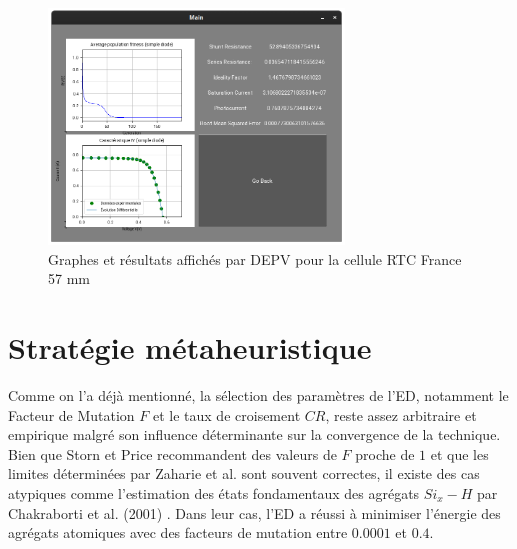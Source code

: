 \begin{figure}[H]
  \begin{center}
    \includegraphics[width=0.7\textwidth]{resources/reswindow.png}
    \caption{Graphes et résultats affichés par DEPV pour la cellule RTC France 57 mm}
    \label{fig:depvres}
  \end{center}
\end{figure}

\section{Stratégie métaheuristique}
Comme on l'a déjà mentionné, la sélection des paramètres de l'ED, notamment le Facteur de Mutation $F$ et le taux de croisement $CR$, reste assez arbitraire et empirique malgré son influence déterminante sur la convergence de la technique. Bien que Storn et Price \cite{Price2005} recommandent des valeurs de $F$ proche de $1$ et que les limites déterminées par Zaharie et al. \cite{Zaharie2002} sont souvent correctes, il existe des cas atypiques comme l'estimation des états fondamentaux des agrégats $Si_{x}-H$ par Chakraborti et al. (2001) \cite{Chakraborti2001}. Dans leur cas, l'ED a réussi à minimiser l'énergie des agrégats atomiques avec des facteurs de mutation entre $0.0001$ et $0.4$.

